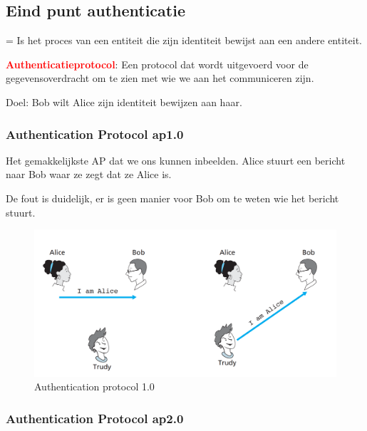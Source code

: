 \newpage
\subsection{Eind punt authenticatie}

\noindent = Is het proces van een entiteit die zijn identiteit bewijst aan een andere entiteit.

\noindent \textcolor{red}{\textbf{Authenticatieprotocol}}: Een protocol dat wordt uitgevoerd voor de gegevensoverdracht om te zien met wie we aan het communiceren zijn.

\noindent Doel: Bob wilt Alice zijn identiteit bewijzen aan haar.

\subsubsection{Authentication Protocol ap1.0}

\noindent Het gemakkelijkste AP dat we ons kunnen inbeelden. Alice stuurt een bericht naar Bob waar ze zegt dat ze Alice is.

\noindent De fout is duidelijk, er is geen manier voor Bob om te weten wie het bericht stuurt.


\begin{figure}[h]
    \centering
    \includegraphics[width=7in]{./img/imghfdst8/Figure8-14.PNG}
    \caption{Authentication protocol 1.0}      
    \label{fig:Authentication protocol 1.0 }
\end{figure}

\newpage

\subsubsection{Authentication Protocol ap2.0}

